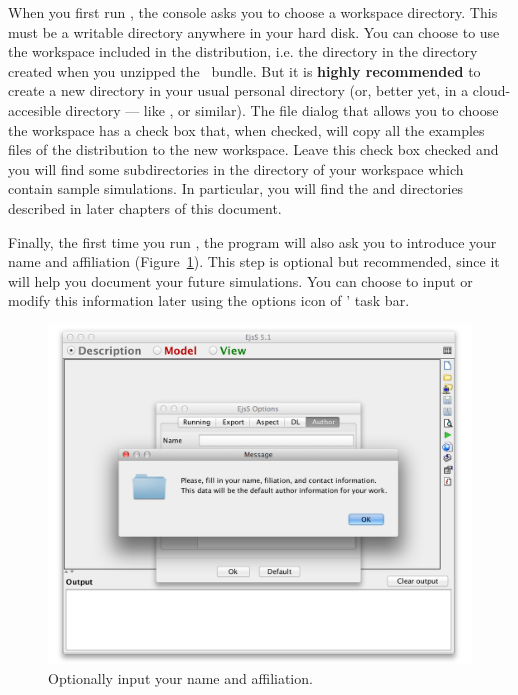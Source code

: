 When you first run \ejs, the console asks you to choose a workspace directory. This must be a writable directory anywhere in your hard disk. You can choose to use the workspace included in the distribution, i.e. the  directory in the  directory created when you unzipped the \ejs\ bundle. But it is \textbf{highly recommended} to create a new directory in your usual personal directory (or, better yet, in a cloud-accesible directory --- like  , or similar). The file dialog that allows you to choose the workspace has a check box that, when checked, will copy all the examples files of the distribution to the new workspace. Leave this check box checked and you will find some subdirectories in the  directory of your workspace which contain sample simulations. In particular, you will find the  and  directories described in later chapters of this document.


Finally, the first time you run \ejs, the program will also ask you to introduce your name and affiliation (Figure~\ref{fig:01Introduction/NameAndAffiliation}). This step is optional but recommended, since it will help you document your future simulations. You can choose to input or modify this information later using the options icon of \ejs' task bar.

\begin{figure}[htb]
  \centering
  \includegraphics[scale=\scale]{01Introduction/images/NameAndAffiliation.png}
  \caption{Optionally input your name and affiliation.}
  \label{fig:01Introduction/NameAndAffiliation}
\end{figure}

